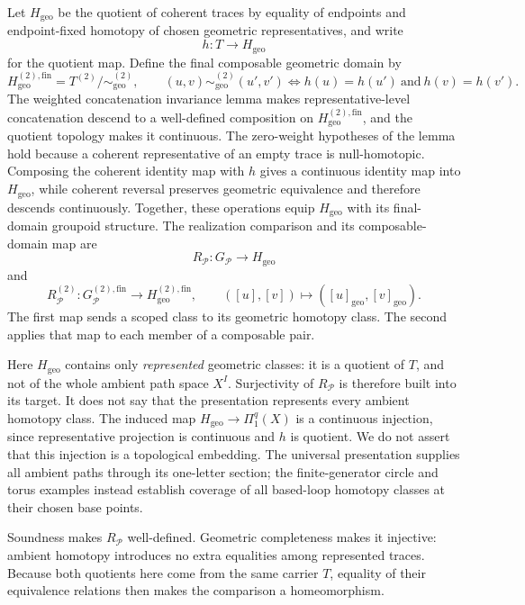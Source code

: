 \documentclass[10pt,reqno]{amsart}
\theoremstyle{definition}
\theoremstyle{plain}
\theoremstyle{remark}
\newcommand{\Fin}{\mathrm{fin}}
\begin{document}
Let $H_{\mathrm{geo}}$ be the quotient of coherent traces by equality of
endpoints and endpoint-fixed homotopy of chosen geometric representatives, and
write
\[
  h:T\longrightarrow H_{\mathrm{geo}}
\]
for the quotient map.  Define the final composable geometric domain by
\[
  H_{\mathrm{geo}}^{(2),\Fin}
  =T^{(2)}/\!\sim_{\mathrm{geo}}^{(2)},
  \qquad
  (u,v)\sim_{\mathrm{geo}}^{(2)}(u',v')
  \Longleftrightarrow h(u)=h(u')\ \text{and}\ h(v)=h(v').
\]
The weighted concatenation invariance lemma makes representative-level
concatenation descend to a well-defined composition on
$H_{\mathrm{geo}}^{(2),\Fin}$, and the quotient topology makes it continuous.
The zero-weight hypotheses of the lemma hold because a coherent
representative of an empty trace is null-homotopic.  Composing the coherent identity map with $h$ gives a continuous
identity map into $H_{\mathrm{geo}}$, while coherent reversal preserves
geometric equivalence and therefore descends continuously.  Together, these
operations equip $H_{\mathrm{geo}}$ with its final-domain groupoid structure.
The realization comparison and its composable-domain map are
\[
  R_{\mathcal P}:G_{\mathcal P}\longrightarrow H_{\mathrm{geo}}
\]
and
\[
  R_{\mathcal P}^{(2)}:G_{\mathcal P}^{(2),\Fin}\longrightarrow
  H_{\mathrm{geo}}^{(2),\Fin},
  \qquad ([u],[v])\longmapsto([u]_{\mathrm{geo}},[v]_{\mathrm{geo}}).
\]
The first map sends a scoped class to its geometric homotopy class.
The second applies that map to each member of a composable pair.

Here $H_{\mathrm{geo}}$ contains only \emph{represented} geometric classes:
it is a quotient of $T$, and not of the whole ambient path space $X^I$.
Surjectivity of $R_{\mathcal P}$ is therefore built into its target.  It does
not say that the presentation represents every ambient homotopy class.
The induced map $H_{\mathrm{geo}}\to\Pi_1^q(X)$ is a continuous injection,
since representative projection is continuous and $h$ is quotient.  We do not
assert that this injection is a topological embedding.  The universal
presentation supplies all ambient paths through its one-letter section;
the finite-generator circle and torus examples instead establish coverage of
all based-loop homotopy classes at their chosen base points.

Soundness makes $R_{\mathcal P}$ well-defined.  Geometric completeness makes
it injective: ambient homotopy introduces no extra equalities among represented
traces.  Because both quotients here come from the same carrier $T$, equality
of their equivalence relations then makes the comparison a homeomorphism.
\end{document}
